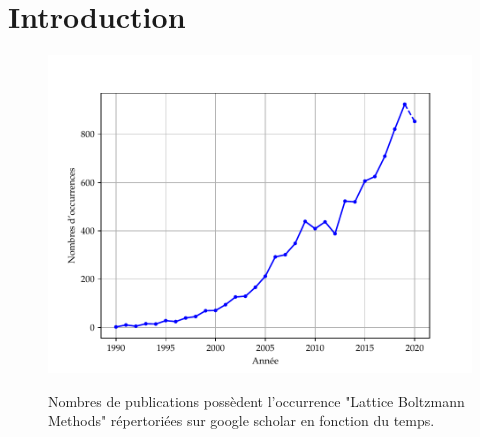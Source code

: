 \documentclass[unnumsec,webpdf,contemporary,large]{oup-authoring-template}%
\theoremstyle{thmstyleone}%
\theoremstyle{thmstyletwo}%
\theoremstyle{thmstylethree}%
\begin{document}
\maketitle

\section{Introduction}
\begin{figure}
	\center
	\includegraphics[width=\linewidth]{LBMocc} 
	\label{trend}
	\caption{Nombres de publications possèdent l'occurrence "Lattice Boltzmann Methods" répertoriées sur google scholar en fonction du temps.}
\end{figure}

\end{document}

